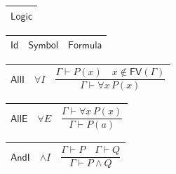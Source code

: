 \documentclass[11pt]{amsart}
\renewcommand{\arraystretch}{1.4}
\newlength{\FTCOneColumnBody}
\newlength{\FTCThreeColumnBody}
\begin{document}
{\centering
\renewcommand{\arraystretch}{1.4}
\par\setlength{\parskip}{0pt}\nointerlineskip
\noindent
\begin{tabular}{|@{}>{\centering\arraybackslash}m{\FTCOneColumnBody}|}\hline
$\displaystyle \textsf{Logic}$\\ \hline
\end{tabular}%
\par\setlength{\parskip}{0pt}\nointerlineskip
\noindent
\begin{tabular}{|@{}>{\centering\arraybackslash}m{0.176056\FTCThreeColumnBody}|>{\centering\arraybackslash}m{0.225352\FTCThreeColumnBody}|>{\centering\arraybackslash}m{0.598591\FTCThreeColumnBody}|}\hline
$\displaystyle \textsf{Id}$ & $\displaystyle \textsf{Symbol}$ & $\displaystyle \textsf{Formula}$\\ \hline
\end{tabular}%
\par\setlength{\parskip}{0pt}\nointerlineskip
\noindent
\begin{tabular}{|@{}>{\centering\arraybackslash}m{0.176056\FTCThreeColumnBody}|>{\centering\arraybackslash}m{0.225352\FTCThreeColumnBody}|>{\centering\arraybackslash}m{0.598591\FTCThreeColumnBody}|}\hline
\hypertarget{rule:AllI}{$\displaystyle \textsf{AllI}$} & $\displaystyle \forall I$ & \rule[-3.3ex]{0pt}{7.8ex}$\displaystyle \dfrac{\Gamma\vdash P(x)\quad x\notin\textsf{FV}(\Gamma)}{\Gamma\vdash\forall x\,P(x)}$\\ \hline
\end{tabular}%
\par\setlength{\parskip}{0pt}\nointerlineskip
\noindent
\begin{tabular}{|@{}>{\centering\arraybackslash}m{0.176056\FTCThreeColumnBody}|>{\centering\arraybackslash}m{0.225352\FTCThreeColumnBody}|>{\centering\arraybackslash}m{0.598591\FTCThreeColumnBody}|}\hline
\hypertarget{rule:AllE}{$\displaystyle \textsf{AllE}$} & $\displaystyle \forall E$ & \rule[-3.3ex]{0pt}{7.8ex}$\displaystyle \dfrac{\Gamma\vdash\forall x\,P(x)}{\Gamma\vdash P(a)}$\\ \hline
\end{tabular}%
\par\setlength{\parskip}{0pt}\nointerlineskip
\noindent
\begin{tabular}{|@{}>{\centering\arraybackslash}m{0.176056\FTCThreeColumnBody}|>{\centering\arraybackslash}m{0.225352\FTCThreeColumnBody}|>{\centering\arraybackslash}m{0.598591\FTCThreeColumnBody}|}\hline
\hypertarget{rule:AndI}{$\displaystyle \textsf{AndI}$} & $\displaystyle \wedge I$ & \rule[-3.3ex]{0pt}{7.8ex}$\displaystyle \dfrac{\Gamma\vdash P\quad\Gamma\vdash Q}{\Gamma\vdash P\land Q}$\\ \hline

\end{tabular}}
\end{document}
